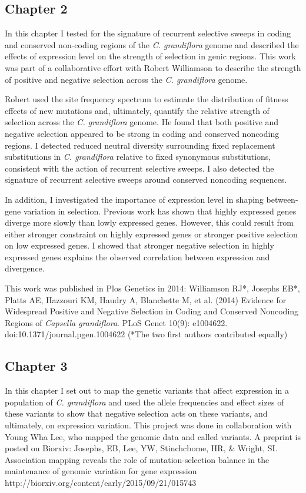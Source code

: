 \subsection{Chapter 2}

In this chapter I tested for the signature of recurrent selective sweeps in coding and conserved non-coding regions of the \textit{C. grandiflora} genome and described the effects of expression level on the strength of selection in genic regions. This work was part of a collaborative effort with Robert Williamson to describe the strength of positive and negative selection across the \textit{C. grandiflora} genome. 

Robert used the site frequency spectrum to estimate the distribution of fitness effects of new mutations and, ultimately, quantify the relative strength of selection across the \textit{C. grandiflora} genome. He found that both positive and negative selection appeared to be strong in coding and conserved noncoding regions. I detected reduced neutral diversity surrounding fixed replacement substitutions in \textit{C. grandiflora} relative to fixed synonymous substitutions, consistent with the action of recurrent selective sweeps. I also detected the signature of recurrent selective sweeps around conserved noncoding sequences.

In addition, I investigated the importance of expression level in shaping between-gene variation in selection. Previous work has shown that highly expressed genes diverge more slowly than lowly expressed genes. However, this could result from either stronger constraint on highly expressed genes or stronger positive selection on low expressed genes. I showed that stronger negative selection in highly expressed genes explains the observed correlation between expression and divergence.

This work was published in Plos Genetics in 2014: Williamson RJ*, Josephs EB*, Platts AE, Hazzouri KM, Haudry A, Blanchette M, et al. (2014) Evidence for Widespread Positive and Negative Selection in Coding and Conserved Noncoding Regions of \textit{Capsella grandiflora}. PLoS Genet 10(9): e1004622. doi:10.1371/journal.pgen.1004622 (*The two first authors contributed equally)

\subsection{Chapter 3}
	In this chapter I set out to map the genetic variants that affect expression in a population of \textit{C. grandiflora} and used the allele frequencies and effect sizes of these variants to show that negative selection acts on these variants, and ultimately, on expression variation. This project was done in collaboration with Young Wha Lee, who mapped the genomic data and called variants. A preprint is posted on Biorxiv: Josephs, EB, Lee, YW, Stinchcbome, HR, \& Wright, SI. Association mapping reveals the role of mutation-selection balance in the maintenance of genomic variation for gene expression  http://biorxiv.org/content/early/2015/09/21/015743

